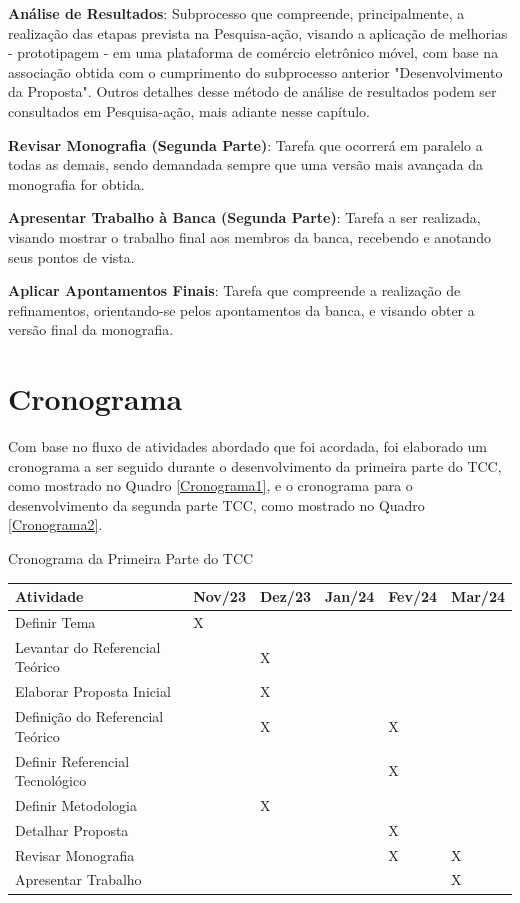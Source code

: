 \textbf{Análise de Resultados}: Subprocesso que compreende, principalmente, a realização das etapas prevista na Pesquisa-ação, visando a aplicação de melhorias - prototipagem - em uma plataforma de comércio eletrônico móvel, com base na associação obtida com o cumprimento do subprocesso anterior "Desenvolvimento da Proposta". Outros detalhes desse método de análise de resultados podem ser consultados em Pesquisa-ação, mais adiante nesse capítulo.

\textbf{Revisar Monografia (Segunda Parte)}: Tarefa que ocorrerá em paralelo a todas as demais, sendo demandada sempre que uma versão mais avançada da monografia for obtida.

\textbf{Apresentar Trabalho à Banca (Segunda Parte)}: Tarefa a ser realizada, visando mostrar o trabalho final aos membros da banca, recebendo e anotando seus pontos de vista.

\textbf{Aplicar Apontamentos Finais}: Tarefa que compreende a realização de refinamentos, orientando-se pelos apontamentos da banca, e visando obter a versão final da monografia.


\section{Cronograma}
    \label{Cronograma}

Com base no fluxo de atividades abordado que foi acordada, foi elaborado um cronograma a ser seguido durante o desenvolvimento da primeira parte do TCC, como mostrado no Quadro \ref{Cronograma1}, e o cronograma para o desenvolvimento da segunda parte TCC, como mostrado no Quadro \ref{Cronograma2}.

\begin{quadro}
\caption{\label{Cronograma1}Cronograma da Primeira Parte do TCC}
\centering

\begin{tabular}{|p{7cm}|p{1.5cm}|p{1.5cm}|p{1.5cm}|p{1.5cm}|p{1.5cm}|}
\hline
\textbf{Atividade} & \textbf{Nov/23} & \textbf{Dez/23} & \textbf{Jan/24} & \textbf{Fev/24} & \textbf{Mar/24} \\ \hline
{Definir Tema} & X &  &  &  &  \\ \hline
{Levantar do Referencial Teórico} &  & X &  &  &  \\ \hline
{Elaborar Proposta Inicial} &  & X &  &  &  \\ \hline
{Definição do Referencial Teórico} &  & X &  & X &  \\ \hline
{Definir Referencial Tecnológico} &  &  &  & X &  \\ \hline
{Definir Metodologia} &  & X &  &  &  \\ \hline
{Detalhar Proposta} &  &  &  & X &  \\ \hline
{Revisar Monografia} &  &  &  & X & X \\ \hline
{Apresentar Trabalho} &  &  &  &  & X \\ \hline
\end{tabular}

\end{quadro} 

